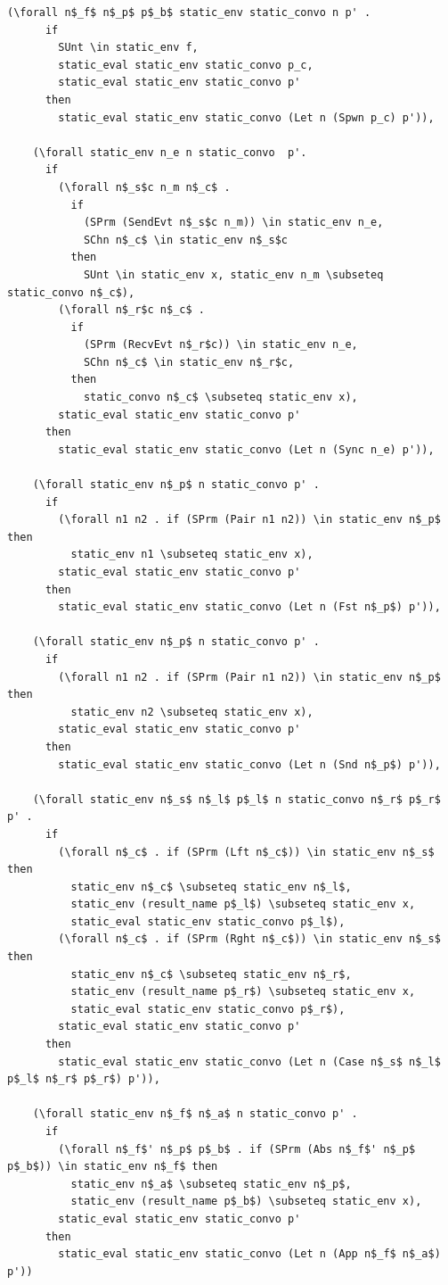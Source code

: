 \documentclass{article}
\begin{document}
\begin{lstlisting}[language=logic, mathescape]
    (\forall n$_f$ n$_p$ p$_b$ static_env static_convo n p' .
      if
        SUnt \in static_env f, 
        static_eval static_env static_convo p_c, 
        static_eval static_env static_convo p'
      then
        static_eval static_env static_convo (Let n (Spwn p_c) p')),

    (\forall static_env n_e n static_convo  p'.
      if
        (\forall n$_s$c n_m n$_c$ . 
          if
            (SPrm (SendEvt n$_s$c n_m)) \in static_env n_e, 
            SChn n$_c$ \in static_env n$_s$c 
          then
            SUnt \in static_env x, static_env n_m \subseteq static_convo n$_c$),
        (\forall n$_r$c n$_c$ . 
          if
            (SPrm (RecvEvt n$_r$c)) \in static_env n_e,
            SChn n$_c$ \in static_env n$_r$c, 
          then
            static_convo n$_c$ \subseteq static_env x),
        static_eval static_env static_convo p'
      then
        static_eval static_env static_convo (Let n (Sync n_e) p')),

    (\forall static_env n$_p$ n static_convo p' . 
      if
        (\forall n1 n2 . if (SPrm (Pair n1 n2)) \in static_env n$_p$ then
          static_env n1 \subseteq static_env x),
        static_eval static_env static_convo p'
      then
        static_eval static_env static_convo (Let n (Fst n$_p$) p')),

    (\forall static_env n$_p$ n static_convo p' . 
      if
        (\forall n1 n2 . if (SPrm (Pair n1 n2)) \in static_env n$_p$ then
          static_env n2 \subseteq static_env x),
        static_eval static_env static_convo p'
      then
        static_eval static_env static_convo (Let n (Snd n$_p$) p')),

    (\forall static_env n$_s$ n$_l$ p$_l$ n static_convo n$_r$ p$_r$ p' . 
      if
        (\forall n$_c$ . if (SPrm (Lft n$_c$)) \in static_env n$_s$ then 
          static_env n$_c$ \subseteq static_env n$_l$,
          static_env (result_name p$_l$) \subseteq static_env x,
          static_eval static_env static_convo p$_l$),
        (\forall n$_c$ . if (SPrm (Rght n$_c$)) \in static_env n$_s$ then 
          static_env n$_c$ \subseteq static_env n$_r$, 
          static_env (result_name p$_r$) \subseteq static_env x, 
          static_eval static_env static_convo p$_r$),
        static_eval static_env static_convo p'
      then
        static_eval static_env static_convo (Let n (Case n$_s$ n$_l$ p$_l$ n$_r$ p$_r$) p')),

    (\forall static_env n$_f$ n$_a$ n static_convo p' . 
      if
        (\forall n$_f$' n$_p$ p$_b$ . if (SPrm (Abs n$_f$' n$_p$ p$_b$)) \in static_env n$_f$ then 
          static_env n$_a$ \subseteq static_env n$_p$, 
          static_env (result_name p$_b$) \subseteq static_env x),
        static_eval static_env static_convo p'
      then
        static_eval static_env static_convo (Let n (App n$_f$ n$_a$) p'))
  \end{lstlisting}
\end{document}
